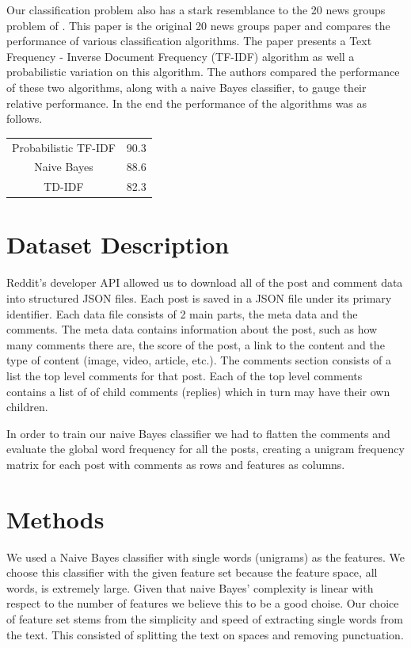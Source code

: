 \documentclass[10pt,twocolumn]{article}
\begin{document}
Our classification problem also has a stark resemblance to the 20 news groups problem of \cite{joachims1996probabilistic}. This paper is the original 20 news groups paper and compares the performance of various classification algorithms. The paper presents a Text Frequency - Inverse Document Frequency (TF-IDF) algorithm as well a probabilistic variation on this algorithm. The authors compared the performance of these two algorithms, along with a naive Bayes classifier, to gauge their relative performance. In the end the performance of the algorithms was as follows.
\\

\begin{tabular}{|c|c|}
\hline
Probabilistic TF-IDF & 90.3 \\
Naive Bayes & 88.6 \\
TD-IDF & 82.3 \\
\hline
\end{tabular}

\section{Dataset Description}

Reddit's developer API allowed us to download all of the post and comment data into structured JSON files. Each post is saved in a JSON file under its primary identifier. Each data file consists of 2 main parts, the meta data and the comments. The meta data contains information about the post, such as how many comments there are, the score of the post, a link to the content and the type of content (image, video, article, etc.). The comments section consists of a list the top level comments for that post. Each of the top level comments contains a list of of child comments (replies) which in turn may have their own children. 

In order to train our naive Bayes classifier we had to flatten the comments and evaluate the global word frequency for all the posts, creating a unigram frequency matrix for each post with comments as rows and features as columns.

\section{Methods}

We used a Naive Bayes classifier with single words (unigrams) as the features. We choose this classifier with the given feature set because the feature space, all words, is extremely large. Given that naive Bayes' complexity is linear with respect to the number of features we believe this to be a good choise. Our choice of feature set stems from the simplicity and speed of extracting single words from the text. This consisted of splitting the text on spaces and removing punctuation. 
\end{document}

